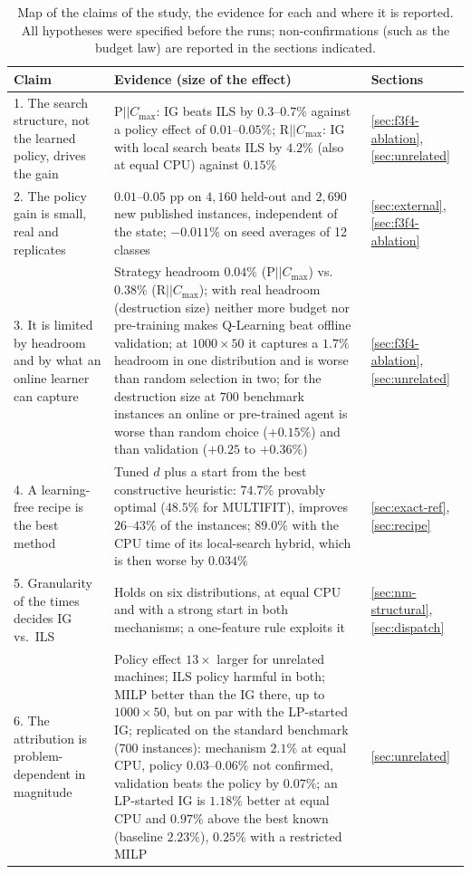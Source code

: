 \documentclass[final,3p,times,11pt,authoryear]{elsarticle}
\begin{document}
\begin{table}[t]
\centering
\caption{Map of the claims of the study, the evidence for each and where it is reported. All hypotheses
were specified before the runs; non-confirmations (such as the budget law) are reported in the sections indicated.}
\label{tab:evidence}
{\scriptsize\setlength{\tabcolsep}{3pt}
\begin{tabular}{@{}p{}p{}p{}@{}}
\toprule
Claim & Evidence (size of the effect) & Sections \\
\midrule
1. The search structure, not the learned policy, drives the gain &
$\mathrm{P}||C_{\max}$: IG beats ILS by $0.3$--$0.7\%$ against a policy effect of $0.01$--$0.05\%$; $\mathrm{R}||C_{\max}$: IG with local search beats ILS by $4.2\%$ (also at equal CPU) against $0.15\%$ &
\ref{sec:f3f4-ablation}, \ref{sec:unrelated} \\[2pt]
2. The policy gain is small, real and replicates &
$0.01$--$0.05$ pp on $4{,}160$ held-out and $2{,}690$ new published instances, independent of the state; $-0.011\%$ on seed averages of 12 classes &
\ref{sec:external}, \ref{sec:f3f4-ablation} \\[2pt]
3. It is limited by headroom and by what an online learner can capture &
Strategy headroom $0.04\%$ ($\mathrm{P}||C_{\max}$) vs.\ $0.38\%$ ($\mathrm{R}||C_{\max}$); with real headroom (destruction size) neither more budget nor pre-training makes Q-Learning beat offline validation; at $1000\times50$ it captures a $1.7\%$ headroom in one distribution and is worse than random selection in two; for the destruction size at $700$ benchmark instances an online or pre-trained agent is worse than random choice ($+0.15\%$) and than validation ($+0.25$ to $+0.36\%$) &
\ref{sec:f3f4-ablation}, \ref{sec:unrelated} \\[2pt]
4. A learning-free recipe is the best method &
Tuned $d$ plus a start from the best constructive heuristic: $74.7\%$ provably optimal ($48.5\%$ for MULTIFIT), improves $26$--$43\%$ of the instances; $89.0\%$ with the CPU time of its local-search hybrid, which is then worse by $0.034\%$ &
\ref{sec:exact-ref}, \ref{sec:recipe} \\[2pt]
5. Granularity of the times decides IG vs.\ ILS &
Holds on six distributions, at equal CPU and with a strong start in both mechanisms; a one-feature rule exploits it &
\ref{sec:nm-structural}, \ref{sec:dispatch} \\[2pt]
6. The attribution is problem-dependent in magnitude &
Policy effect $13\times$ larger for unrelated machines; ILS policy harmful in both; MILP better than the IG there, up to $1000\times50$, but on par with the LP-started IG; replicated on the standard benchmark (700 instances): mechanism $2.1\%$ at equal CPU, policy $0.03$--$0.06\%$ not confirmed, validation beats the policy by $0.07\%$; an LP-started IG is $1.18\%$ better at equal CPU and $0.97\%$ above the best known (baseline $2.23\%$), $0.25\%$ with a restricted MILP &
\ref{sec:unrelated} \\
\bottomrule
\end{tabular}}
\end{table}
\end{document}
